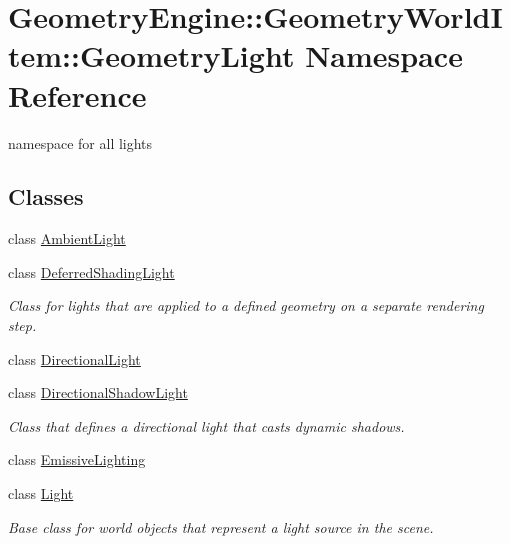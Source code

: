 \hypertarget{namespace_geometry_engine_1_1_geometry_world_item_1_1_geometry_light}{}\section{Geometry\+Engine\+::Geometry\+World\+Item\+::Geometry\+Light Namespace Reference}
\label{namespace_geometry_engine_1_1_geometry_world_item_1_1_geometry_light}


namespace for all lights  


\subsection*{Classes}
\begin{DoxyCompactItemize}
\item 
class \mbox{\hyperlink{class_geometry_engine_1_1_geometry_world_item_1_1_geometry_light_1_1_ambient_light}{Ambient\+Light}}
\item 
class \mbox{\hyperlink{class_geometry_engine_1_1_geometry_world_item_1_1_geometry_light_1_1_deferred_shading_light}{Deferred\+Shading\+Light}}
\begin{DoxyCompactList}\small\item\em Class for lights that are applied to a defined geometry on a separate rendering step. \end{DoxyCompactList}\item 
class \mbox{\hyperlink{class_geometry_engine_1_1_geometry_world_item_1_1_geometry_light_1_1_directional_light}{Directional\+Light}}
\item 
class \mbox{\hyperlink{class_geometry_engine_1_1_geometry_world_item_1_1_geometry_light_1_1_directional_shadow_light}{Directional\+Shadow\+Light}}
\begin{DoxyCompactList}\small\item\em Class that defines a directional light that casts dynamic shadows. \end{DoxyCompactList}\item 
class \mbox{\hyperlink{class_geometry_engine_1_1_geometry_world_item_1_1_geometry_light_1_1_emissive_lighting}{Emissive\+Lighting}}
\item 
class \mbox{\hyperlink{class_geometry_engine_1_1_geometry_world_item_1_1_geometry_light_1_1_light}{Light}}
\begin{DoxyCompactList}\small\item\em Base class for world objects that represent a light source in the scene. \end{DoxyCompactList}\item 

\end{DoxyCompactItemize}
